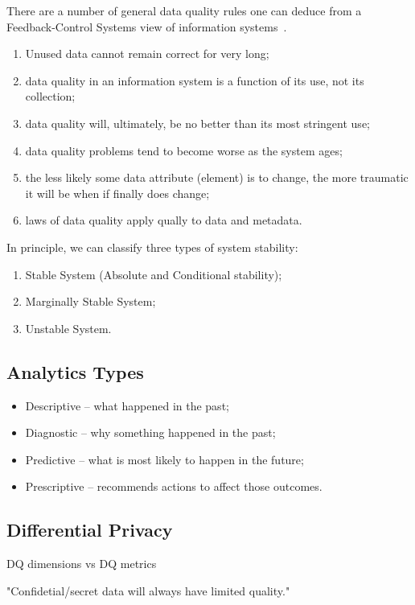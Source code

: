 There are a number of general data quality rules one can deduce from a Feedback-Control Systems view of information systems~\cite{orr1998}.

\begin{enumerate}
    \item Unused data cannot remain correct for very long;
    \item data quality in an information system is a function of its use, not its collection;
    \item data quality will, ultimately, be no better than its most stringent use;
    \item data quality problems tend to become worse as the system ages;
    \item the less likely some data attribute (element) is to change, the more traumatic it will be when if finally does change;
    \item laws of data quality apply qually to data and metadata.
\end{enumerate}

\noindent In principle, we can classify three types of system stability:

\begin{enumerate}
    \item Stable System (Absolute and Conditional stability);
    \item Marginally Stable System;
    \item Unstable System.
\end{enumerate}

\subsection{Analytics Types}

\begin{itemize}
    \item Descriptive – what happened in the past;
    \item Diagnostic – why something happened in the past;
    \item Predictive – what is most likely to happen in the future;
    \item Prescriptive – recommends actions to affect those outcomes.
\end{itemize}

\subsection{Differential Privacy}

DQ dimensions vs DQ metrics

"Confidetial/secret data will always have limited quality."
